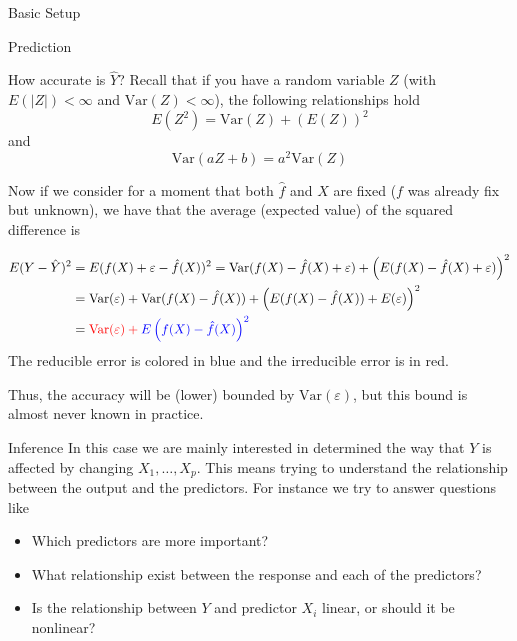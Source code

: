 \documentclass[
  ignorenonframetext,
]{beamer}
\providecommand{\tightlist}{%
  \setlength{\itemsep}{0pt}\setlength{\parskip}{0pt}}\usepackage{longtable,booktabs,array}
\begin{document}
\begin{frame}{Basic Setup}
\begin{block}{Prediction}
\begin{block}{How accurate is \(\hat{Y}\)?}
Recall that if you have a random variable \(Z\) (with \(E(|Z|)<\infty\)
and \(\mathrm{Var}(Z)<\infty\)), the following relationships hold
\[E(Z^2)= \mathrm{Var}(Z) + (E(Z))^2\] and
\[\mathrm{Var}(aZ+b)= a^2\mathrm{Var}(Z)\]

Now if we consider for a moment that both \(\hat{f}\) and \(X\) are
fixed (\(f\) was already fix but unknown), we have that the average
(expected value) of the squared difference is

\[
\begin{align}
E(Y-\hat{Y})^2&= E(f(X)+ \varepsilon -\hat{f}(X))^2= \mathrm{Var}(f(X)-\hat{f}(X)+ \varepsilon ) + \left(E(f(X)-\hat{f}(X)+\varepsilon) \right)^2 \\
&= \mathrm{Var}(\varepsilon) + \mathrm{Var}(f(X)-\hat{f}(X))+ \left( E(f(X)-\hat{f}(X)) + E(\varepsilon) \right)^2\\
&= \color{red}{\mathrm{Var}(\varepsilon)}+\color{blue}{E\left( f(X)-\hat{f}(X)\right)^2} 
\end{align}
\] The reducible error is colored in blue and the irreducible error is
in red.

Thus, the accuracy will be (lower) bounded by
\(\mathrm{Var}(\varepsilon)\), but this bound is almost never known in
practice.
\end{block}
\end{block}

\begin{block}{Inference}
\label{inference}
In this case we are mainly interested in determined the way that \(Y\)
is affected by changing \(X_1,\ldots,X_p\). This means trying to
understand the relationship between the output and the predictors. For
instance we try to answer questions like

\begin{itemize}
\tightlist
\item
  Which predictors are more important?
\item
  What relationship exist between the response and each of the
  predictors?
\item
  Is the relationship between \(Y\) and predictor \(X_i\) linear, or
  should it be nonlinear?
\end{itemize}
\end{block}
\end{frame}
\end{document}

